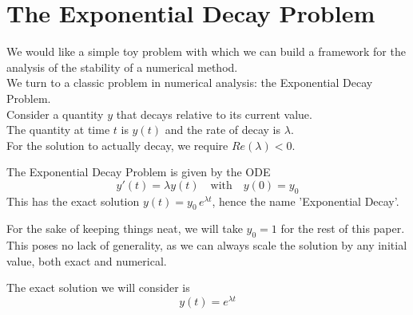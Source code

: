 \section{The Exponential Decay Problem}

\par We would like a simple toy problem with which we can build a framework for the analysis of the stability of a numerical method.\\
We turn to a classic problem in numerical analysis: the Exponential Decay Problem.\\
Consider a quantity $y$ that decays relative to its current value.\\
The quantity at time $t$ is $y(t)$ and the rate of decay is $\lambda$.\\
For the solution to actually decay, we require $Re(\lambda) < 0$.\\

\par The Exponential Decay Problem is given by the ODE
\[y'(t) = \lambda y(t) \quad \text{with} \quad y(0) = y_0\]
This has the exact solution $y(t) = y_0\, e^{\lambda t}$, hence the name 'Exponential Decay'.\\

\par For the sake of keeping things neat, we will take $y_0 = 1$ for the rest of this paper.\\
This poses no lack of generality, as we can always scale the solution by any initial value, both exact and numerical.\\

\par The exact solution we will consider is \[y(t) = e^{\lambda t}\]\\

